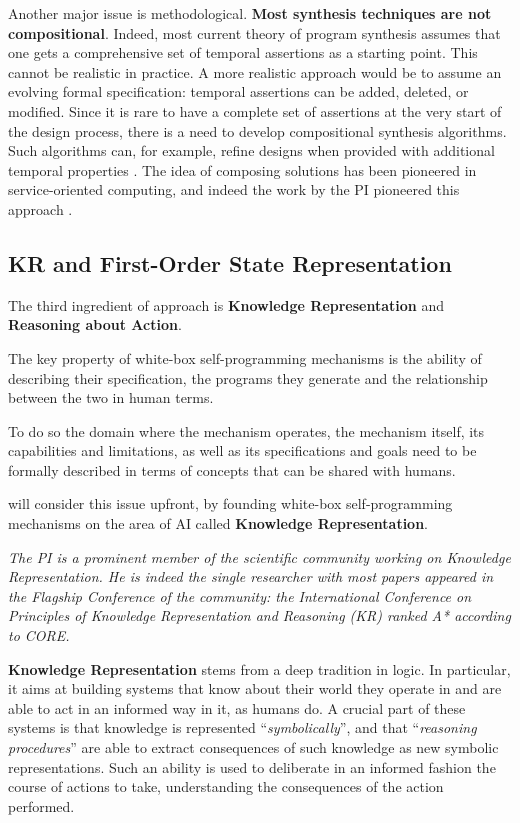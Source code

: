 Another major issue is methodological. 
\textbf{Most synthesis techniques are not compositional}.
  Indeed, most current theory of
  program synthesis assumes that one gets a comprehensive set of
  temporal assertions as a starting point. This cannot be realistic in
  practice. A more realistic approach would be to assume an evolving
  formal specification: temporal assertions can be added, deleted, or
  modified. Since it is rare to have a complete set of assertions at
  the very start of the design process, there is a need to develop
  compositional synthesis algorithms. Such algorithms can, for
  example, refine designs when provided with additional temporal
  properties \cite{KupfermanPV06,FiliotJR11,AlurMT16}. The idea of
  composing solutions has been pioneered in service-oriented
  computing, and indeed the work by the PI pioneered this approach
  \cite{BerardiCGLM03,DeGiacomoFPS10,DePS13,CalvaneseGLV16}.

\subsection{KR and First-Order State Representation}

The third ingredient of \project approach is \textbf{Knowledge Representation} and \textbf{Reasoning about Action}.


The key property of white-box self-programming mechanisms is the
ability of describing their specification, the programs they generate
and the relationship between the two in human terms.

To do so the domain where the mechanism operates, the 
mechanism itself, its capabilities and limitations, as well as
its specifications and goals need to be formally described in terms of concepts that
can be shared with humans.

\project will consider this issue upfront, by founding white-box self-programming mechanisms on the area of AI called \textbf{Knowledge Representation}. 

\emph{
The PI is  a prominent member of the scientific community working on Knowledge Representation. He is indeed the single researcher with most papers appeared in the Flagship Conference of the community: the International Conference on Principles of Knowledge Representation and Reasoning (KR) ranked A* according to CORE.
}


\textbf{Knowledge Representation} stems from a deep
tradition in logic. In particular, it aims at building systems that
know about their world they operate in and are able to act in an informed way in it,
as humans do.
A crucial part of these systems is that knowledge is represented
``\emph{symbolically}'', and that ``\emph{reasoning procedures}'' are able to extract
consequences of such knowledge as new symbolic representations. Such
an ability is used to deliberate in an informed fashion the course of
actions to take, understanding the consequences of the action performed.

